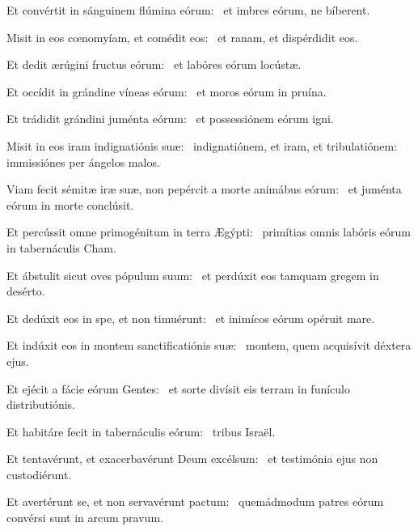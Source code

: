 \item Et convértit in sánguinem flúmina eórum:~\psstar{} et imbres eórum, ne bíberent.

\item Misit in eos cœnomyíam, et comédit eos:~\psstar{} et ranam, et dispérdidit eos.

\item Et dedit ærúgini fructus eórum:~\psstar{} et labóres eórum locústæ.

\item Et occídit in grándine víneas eórum:~\psstar{} et moros eórum in pruína.

\item Et trádidit grándini juménta eórum:~\psstar{} et possessiónem eórum igni.

\item Misit in eos iram indignatiónis suæ:~\psstar{} indignatiónem, et iram, et tribulatiónem: immissiónes per ángelos malos.

\item Viam fecit sémitæ iræ suæ, non pepércit a morte animábus eórum:~\psstar{} et juménta eórum in morte conclúsit.

\item Et percússit omne primogénitum in terra Ægýpti:~\psstar{} primítias omnis labóris eórum in tabernáculis Cham.

\item Et ábstulit sicut oves pópulum suum:~\psstar{} et perdúxit eos tamquam gregem in desérto.

\item Et dedúxit eos in spe, et non timuérunt:~\psstar{} et inimícos eórum opéruit mare.

\item Et indúxit eos in montem sanctificatiónis suæ:~\psstar{} montem, quem acquisívit déxtera ejus.

\item Et ejécit a fácie eórum Gentes:~\psstar{} et sorte divísit eis terram in funículo distributiónis.

\item Et habitáre fecit in tabernáculis eórum:~\psstar{} tribus Israël.

\item Et tentavérunt, et exacerbavérunt Deum excélsum:~\psstar{} et testimónia ejus non custodiérunt.

\item Et avertérunt se, et non servavérunt pactum:~\psstar{} quemádmodum patres eórum convérsi sunt in arcum pravum.

